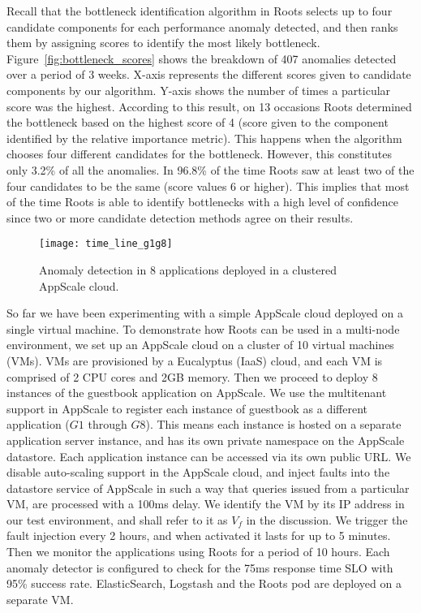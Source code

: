 Recall that the bottleneck identification algorithm in Roots
selects up to four candidate components for each performance anomaly detected, and then ranks them
by assigning scores to identify the most likely bottleneck. Figure~\ref{fig:bottleneck_scores} shows the breakdown of 407 anomalies
detected over a period of 3 weeks. X-axis represents the different scores given to candidate components
by our algorithm. Y-axis shows the number of times a particular score was the highest. 
According to this result, on 13 occasions Roots determined the bottleneck based on the highest score
of 4 (score given to the component identified by the relative importance metric). 
This happens when the algorithm chooses four different candidates
for the bottleneck. However, this constitutes only 3.2\% of all the anomalies. In 96.8\% of the time Roots saw
at least two of the four candidates to be the same (score values 6 or higher). This implies that most of the time Roots is able to
identify bottlenecks with a high level of confidence since two or more candidate detection methods
agree on their results.

\begin{figure}
\centering
\texttt{[image: time\_line\_g1g8]}
\caption{Anomaly detection in 8 applications deployed in a clustered AppScale cloud.}
\label{fig:time_line_g1g8}
\end{figure}

So far we have been experimenting with a simple AppScale cloud deployed on a single virtual machine.
To demonstrate how Roots can be used in a multi-node environment, we set up an AppScale cloud
on a cluster of 10 virtual machines (VMs). VMs are provisioned by a Eucalyptus (IaaS)
cloud, and each VM is comprised of 2 CPU cores and 2GB memory. Then we proceed
to deploy 8 instances of the guestbook application on AppScale. We use the multitenant support
in AppScale to register each instance of guestbook as a different application ($G1$ through $G8$). This means each instance
is hosted on a separate application server instance, and has its own private namespace on the AppScale
datastore. Each application instance can be accessed via its own public URL. We disable auto-scaling support in 
the AppScale cloud, and inject faults into the datastore service of AppScale in such a way that queries
issued from a particular VM, are processed with a 100ms delay. We identify the VM by its IP address
in our test environment, and shall refer to it as $V_f$ in the discussion. We trigger
the fault injection every 2 hours, and when activated it lasts for up to 5 minutes. Then we monitor
the applications using Roots for a period of 10 hours. Each anomaly detector is configured
to check for the 75ms response time SLO with 95\% success rate. 
ElasticSearch, Logstash and the Roots pod are deployed on a separate VM. 

